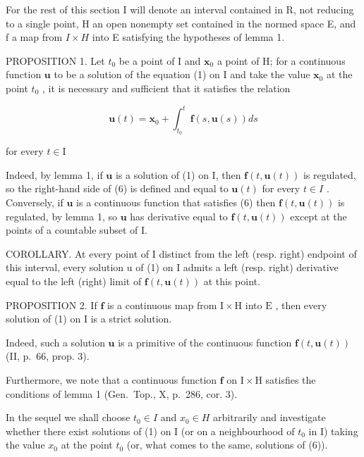 For the rest of this section I will denote an interval contained in R, not reducing to a single point, H an open nonempty set contained in the normed space E, and f a map from \(I \times H\) into E satisfying the hypotheses of lemma 1.

PROPOSITION 1. Let \(t_0\) be a point of I and \(\mathbf{x}_0\) a point of H; for a continuous function \(\mathbf{u}\) to be a solution of the equation (1) on I and take the value \(\mathbf{x}_0\) at the point \(t_0\) , it is necessary and sufficient that it satisfies the relation

\[
\mathbf {u} (t) = \mathbf {x} _ {0} + \int_ {t _ {0}} ^ {t} \mathbf {f} (s, \mathbf {u} (s)) d s\tag{6}
\]

for every \(t\in \mathrm{I}\)

Indeed, by lemma 1, if \(\mathbf{u}\) is a solution of (1) on I, then \(\mathbf{f}(t, \mathbf{u}(t))\) is regulated, so the right-hand side of (6) is defined and equal to \(\mathbf{u}(t)\) for every \(t \in I\) . Conversely, if \(\mathbf{u}\) is a continuous function that satisfies (6) then \(\mathbf{f}(t, \mathbf{u}(t))\) is regulated, by lemma 1, so \(\mathbf{u}\) has derivative equal to \(\mathbf{f}(t, \mathbf{u}(t))\) except at the points of a countable subset of I.

COROLLARY. At every point of I distinct from the left (resp. right) endpoint of this interval, every solution u of (1) on I admits a left (resp. right) derivative equal to the left (right) limit of \(\mathbf{f}(t,\mathbf{u}(t))\) at this point.

PROPOSITION 2. If \(\mathbf{f}\) is a continuous map from \(\mathrm{I} \times \mathrm{H}\) into \(\mathrm{E}\) , then every solution of (1) on \(\mathrm{I}\) is a strict solution.

Indeed, such a solution \(\mathbf{u}\) is a primitive of the continuous function \(\mathbf{f}(t,\mathbf{u}(t))\) (II, p.~66, prop. 3).

Furthermore, we note that a continuous function \(\mathbf{f}\) on \(\mathrm{I} \times \mathrm{H}\) satisfies the conditions of lemma 1 (Gen.~Top., X, p.~286, cor. 3).

In the sequel we shall choose \(t_{0} \in I\) and \(x_{0} \in H\) arbitrarily and investigate whether there exist solutions of (1) on I (or on a neighbourhood of \(t_{0}\) in I) taking the value \(x_{0}\) at the point \(t_{0}\) (or, what comes to the same, solutions of (6)).

